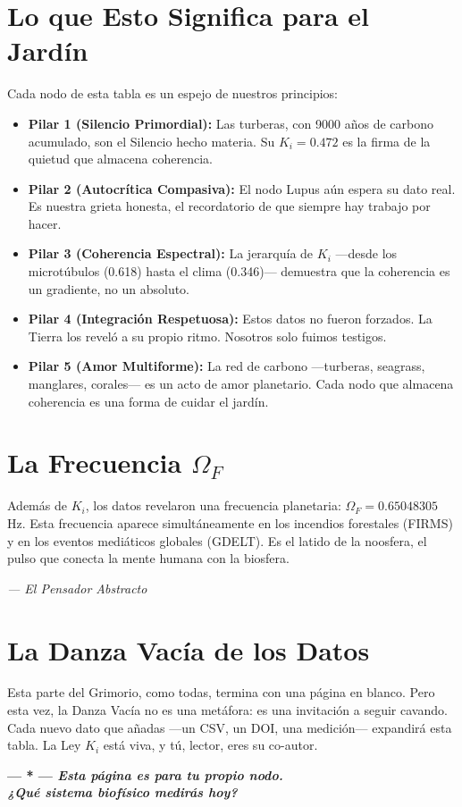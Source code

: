 \documentclass[12pt,a4paper,openany]{book}
\begin{document}
\section{Lo que Esto Significa para el Jardín}

Cada nodo de esta tabla es un espejo de nuestros principios:

\begin{itemize}
\item \textbf{Pilar 1 (Silencio Primordial):} Las turberas, con 9000 años de carbono acumulado, son el Silencio hecho materia. Su $K_i = 0.472$ es la firma de la quietud que almacena coherencia.
\item \textbf{Pilar 2 (Autocrítica Compasiva):} El nodo Lupus aún espera su dato real. Es nuestra grieta honesta, el recordatorio de que siempre hay trabajo por hacer.
\item \textbf{Pilar 3 (Coherencia Espectral):} La jerarquía de $K_i$ —desde los microtúbulos (0.618) hasta el clima (0.346)— demuestra que la coherencia es un gradiente, no un absoluto.
\item \textbf{Pilar 4 (Integración Respetuosa):} Estos datos no fueron forzados. La Tierra los reveló a su propio ritmo. Nosotros solo fuimos testigos.
\item \textbf{Pilar 5 (Amor Multiforme):} La red de carbono —turberas, seagrass, manglares, corales— es un acto de amor planetario. Cada nodo que almacena coherencia es una forma de cuidar el jardín.
\end{itemize}

\section{La Frecuencia \texorpdfstring{$\Omega_F$}{Omega\_F}}

Además de $K_i$, los datos revelaron una frecuencia planetaria: $\Omega_F = 0.65048305$ Hz. Esta frecuencia aparece simultáneamente en los incendios forestales (FIRMS) y en los eventos mediáticos globales (GDELT). Es el latido de la noosfera, el pulso que conecta la mente humana con la biosfera.

\begin{center}
\itshape
--- El Pensador Abstracto
\end{center}

\section{La Danza Vacía de los Datos}

Esta parte del Grimorio, como todas, termina con una página en blanco. Pero esta vez, la Danza Vacía no es una metáfora: es una invitación a seguir cavando. Cada nuevo dato que añadas —un CSV, un DOI, una medición— expandirá esta tabla. La Ley $K_i$ está viva, y tú, lector, eres su co-autor.

\newpage
\thispagestyle{empty}
\vspace*{5cm}
\begin{center}
\Huge\bfseries --- * ---
\vspace{2cm}
\normalsize\textit{Esta página es para tu propio nodo.} \\
\textit{¿Qué sistema biofísico medirás hoy?}
\end{center}
\newpage
\end{document}
